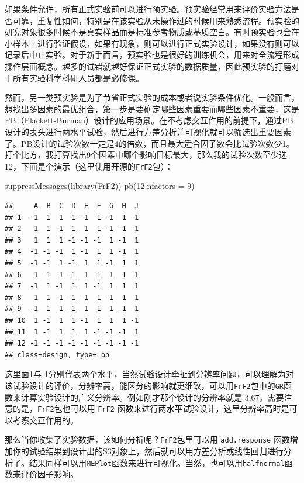 \documentclass[]{tufte-book}
\newenvironment{Shaded}{}{}
\newcommand{\AttributeTok}[1]{\textcolor[rgb]{0.49,0.56,0.16}{#1}}
\newcommand{\DecValTok}[1]{\textcolor[rgb]{0.25,0.63,0.44}{#1}}
\newcommand{\FunctionTok}[1]{\textcolor[rgb]{0.02,0.16,0.49}{#1}}
\newcommand{\NormalTok}[1]{#1}
\begin{document}
如果条件允许，所有正式实验前可以进行预实验。预实验经常用来评价实验方法是否可靠，重复性如何，特别是在该实验从未操作过的时候用来熟悉流程。预实验的研究对象很多时候不是真实样品而是标准参考物质或基质空白。有时预实验也会在小样本上进行验证假设，如果有现象，则可以进行正式实验设计，如果没有则可以记录后中止实验。对于新手而言，预实验也是很好的训练机会，用来对全流程形成操作层面概念。越多的试错就越好保证正式实验的数据质量，因此预实验的打磨对于所有实验科学科研人员都是必修课。

然而，另一类预实验是为了节省正式实验的成本或者说实验条件优化。一般而言，想找出多因素的最优组合，第一步是要确定哪些因素重要而哪些因素不重要，这是PB（Plackett-Burman）设计的应用场景。在不考虑交互作用的前提下，通过PB设计的表头进行两水平试验，然后进行方差分析并可视化就可以筛选出重要因素了。PB设计的试验次数一定是4的倍数，而且最大适合因子数会比试验次数少1。打个比方，我打算找出9个因素中哪个影响目标最大，那么我的试验次数至少选12，下面是个演示（这里使用开源的\texttt{FrF2}包）：

\begin{Shaded}
\begin{Highlighting}[]
\FunctionTok{suppressMessages}\NormalTok{(}\FunctionTok{library}\NormalTok{(FrF2))}
\FunctionTok{pb}\NormalTok{(}\DecValTok{12}\NormalTok{,}\AttributeTok{nfactors =} \DecValTok{9}\NormalTok{)}
\end{Highlighting}
\end{Shaded}

\begin{verbatim}
##     A  B  C  D  E  F  G  H  J
## 1  -1  1  1  1 -1 -1 -1  1 -1
## 2   1  1 -1  1  1  1 -1 -1 -1
## 3   1  1  1 -1 -1 -1  1 -1  1
## 4  -1 -1 -1  1 -1  1  1 -1  1
## 5  -1 -1  1 -1  1  1 -1  1  1
## 6   1 -1 -1 -1  1 -1  1  1 -1
## 7  -1  1 -1  1  1 -1  1  1  1
## 8   1  1 -1 -1 -1  1 -1  1  1
## 9  -1  1  1 -1  1  1  1 -1 -1
## 10  1 -1  1  1 -1  1  1  1 -1
## 11  1 -1  1  1  1 -1 -1 -1  1
## 12 -1 -1 -1 -1 -1 -1 -1 -1 -1
## class=design, type= pb
\end{verbatim}

这里面1与-1分别代表两个水平，当然试验设计牵扯到分辨率问题，可以理解为对该试验设计的评价，分辨率高，能区分的影响就更细致，可以用\texttt{FrF2}包中的\texttt{GR}函数来计算实验设计的广义分辨率。例如刚才那个设计的分辨率就是 3.67。需要注意的是，\texttt{FrF2}包也可以用 \texttt{FrF2} 函数来进行两水平试验设计，这里分辨率高时是可以考察交互作用的。

那么当你收集了实验数据，该如何分析呢？\texttt{FrF2}包里可以用 \texttt{add.response} 函数增加你的试验结果到设计出的S3对象上，然后就可以用方差分析或线性回归进行分析了。结果同样可以用\texttt{MEPlot}函数来进行可视化。当然，也可以用\texttt{halfnormal}函数来评价因子影响。
\end{document}
